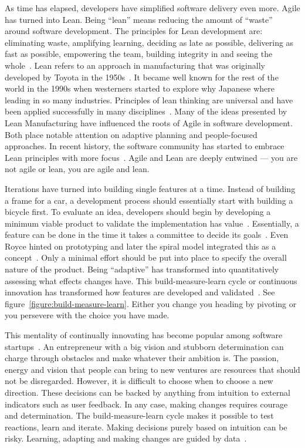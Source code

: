 \documentclass[english]{tktltiki2}
\begin{document}
As time has elapsed, developers have simplified software delivery even more. Agile has turned into Lean. Being “lean” means reducing the amount of “waste” around software development. The principles for Lean development are: eliminating waste, amplifying learning, deciding as late as possible, delivering as fast as possible, empowering the team, building integrity in and seeing the whole~\cite{DD08}. Lean refers to an approach in manufacturing that was originally developed by Toyota in the 1950s~\cite{Fow08}. It became well known for the rest of the world in the 1990s when westerners started to explore why Japanese where leading in so many industries. Principles of lean thinking are universal and have been applied successfully in many disciplines~\cite{Pop02}. Many of the ideas presented by Lean Manufacturing have influenced the roots of Agile in software development. Both place notable attention on adaptive planning and people-focused approaches. In recent history, the software community has started to embrace Lean principles with more focus~\cite{Fow08}. Agile and Lean are deeply entwined — you are not agile or lean, you are agile and lean.

Iterations have turned into building single features at a time. Instead of building a frame for a car, a development process should essentially start with building a bicycle first. To evaluate an idea, developers should begin by developing a minimum viable product to validate the implementation has value~\cite{Rie11}. Essentially, a feature can be done in the time it takes a committee to decide its goals~\cite{Pop02}. Even Royce hinted on prototyping and later the spiral model integrated this as a concept~\cite{Roy70, Boe88}. Only a minimal effort should be put into place to specify the overall nature of the product. Being “adaptive” has transformed into quantitatively assessing what effects changes have. This build-measure-learn cycle or continuous innovation has transformed how features are developed and validated~\cite{Rie11}. See figure~\ref{figure:build-measure-learn}. Either you change you heading by pivoting or you persevere with the choice you have made.

This mentality of continually innovating has become popular among software startups~\cite{Rie11}. An entrepreneur with a big vision and stubborn determination can charge through obstacles and make whatever their ambition is. The passion, energy and vision that people can bring to new ventures are resources that should not be disregarded. However, it is difficult to choose when to choose a new direction. These decisions can be backed by anything from intuition to external indicators such as user feedback. In any case, making changes requires courage and determination. The build-measure-learn cycle makes it possible to test reactions, learn and iterate. Making decisions purely based on intuition can be risky. Learning, adapting and making changes are guided by data~\cite{Rie11}.
\end{document}
